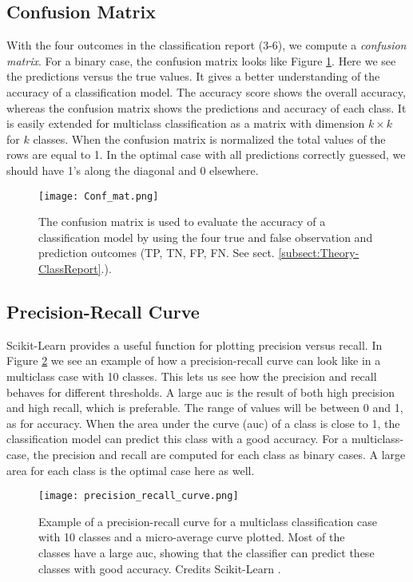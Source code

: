 \documentclass[a4paper, american, 12pt]{report}
\begin{document}
	
	\subsection{Confusion Matrix}
	\label{subsect:Theory-ConfusionMat}
	With the four outcomes in the classification report (3-6), we compute a \textit{confusion matrix}. For a binary case, the confusion matrix looks like Figure \ref{fig:ConfusionMatrix}. Here we see the predictions versus the true values. It gives a better understanding of the accuracy of a classification model. The accuracy score shows the overall accuracy, whereas the confusion matrix shows the predictions and accuracy of each class. It is easily extended for multiclass classification as a matrix with dimension $k\times k$ for $k$ classes. When the confusion matrix is normalized the total values of the rows are equal to 1. In the optimal case with all predictions correctly guessed, we should have 1's along the diagonal and 0 elsewhere.
	\begin{figure}[htb!]
		\hspace*{-1.0cm}
		\centering\texttt{[image: Conf\_mat.png]}
		\caption[Confusion matrix.]{The confusion matrix is used to evaluate the accuracy of a classification model by using the four true and false observation and prediction outcomes (TP, TN, FP, FN. See sect. \ref{subsect:Theory-ClassReport}.). \label{fig:ConfusionMatrix}}
	\end{figure}


	\subsection{Precision-Recall Curve}
	\label{subsect:Theory-PrecisionRecall}
	Scikit-Learn provides a useful function for plotting precision versus recall. In Figure \ref{fig:PrecisionRecall} we see an example of how a precision-recall curve can look like in a multiclass case with 10 classes. This lets us see how the precision and recall behaves for different thresholds. A large \acrshort{auc} is the result of both high precision and high recall, which is preferable. The range of values will be between 0 and 1, as for accuracy. When the area under the curve (\acrshort{auc}) of a class is close to 1, the classification model can predict this class with a good accuracy. For a multiclass-case, the precision and recall are computed for each class as binary cases. A large area for each class is the optimal case here as well.
	\begin{figure}[htb!]
		\hspace*{-1.0cm}
		\centering\texttt{[image: precision\_recall\_curve.png]}
		\caption[Precision-Recall Curve.]{Example of a precision-recall curve for a multiclass classification case with 10 classes and a micro-average curve plotted. Most of the classes have a large \acrshort{auc}, showing that the classifier can predict these classes with good accuracy. Credits Scikit-Learn \cite{scikit-learn}. \label{fig:PrecisionRecall}}
	\end{figure}
	
\end{document}
